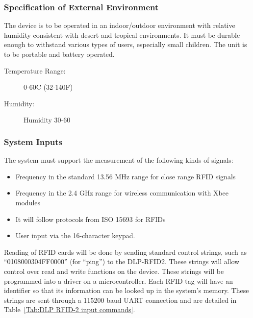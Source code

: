 \documentclass[12pt]{article} %
\begin{document}
\subsubsection{Specification of External Environment}\label{designExtEnv}
The device is to be operated in an indoor/outdoor environment with relative humidity consistent with desert and tropical environments. It must be durable enough to withstand various types of users, especially small children.  The unit is to be portable and battery operated.

\begin{description}
	\item[Temperature Range:] 0-60C (32-140F)
	\item[Humidity:] Humidity 30-60%
\end{description}

\subsubsection{System Inputs}\label{inputs}
The system must support the measurement of the following kinds of signals:

\begin{itemize}
	\item Frequency in the standard 13.56 MHz range for close range RFID signals
	\item Frequency in the 2.4 GHz range for wireless communication with Xbee modules
	\item It will follow protocols from ISO 15693 for RFIDs
	\item User input via the 16-character keypad.
\end{itemize}

Reading of RFID cards will be done by sending standard control strings, such as “0108000304FF0000” (for “ping”) to the DLP-RFID2.  These strings will allow control over read and write functions on the device.  These strings will be programmed into a driver on a microcontroller.  Each RFID tag will have an identifier so that its information can be looked up in the system’s memory.   These strings are sent through a 115200 baud UART connection and are detailed in Table~\ref{Tab:DLP RFID-2 input commands}.
\end{document}
